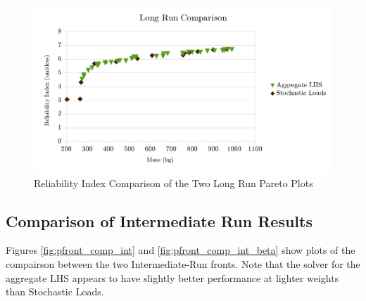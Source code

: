 \begin{figure}[!htb]
\includegraphics[width=\textwidth]{img/pf_comp_long_beta.png}
\caption{Reliability Index Comparison of the Two Long Run Pareto Plots}
\label{fig:pfront_comp_long_beta}
\end{figure}

\subsection{Comparison of Intermediate Run Results}
Figures \ref{fig:pfront_comp_int} and \ref{fig:pfront_comp_int_beta} show plots of the compairson between the two Intermediate-Run fronts. Note that the solver for the aggregate LHS appears to have slightly better performance at lighter weights than Stochastic Loads. 

